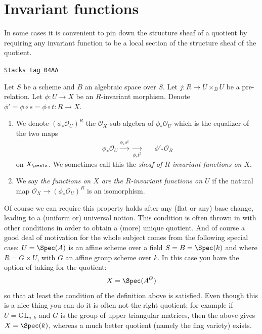 \section{Invariant functions}
\label{groupoids-quotients-section-functions}
In some cases it is convenient to pin down the structure sheaf
of a quotient by requiring any invariant function to be a local
section of the structure sheaf of the quotient.

\begin{definition}[Functions]
\label{groupoids-quotients-definition-functions}
\href{https://stacks.math.columbia.edu/tag/04AA}{\texttt{Stacks tag 04AA}}

Let $S$ be a scheme and $B$ an algebraic space over $S$.
Let $j : R \to U \times_B U$ be a pre-relation.
Let $\phi : U \to X$ be an $R$-invariant morphism.
Denote $\phi' = \phi \circ s = \phi \circ t : R \to X$.
\begin{enumerate}
\item We denote $(\phi_*\mathcal{O}_U)^R$ the $\mathcal{O}_X$-sub-algebra
of $\phi_*\mathcal{O}_U$ which is the equalizer of the two maps
$$
\begin{array}{ccc}\phi_*\mathcal{O}_U
\overset{\phi_*s^\sharp}{\longrightarrow}\underset{\phi_*t^\sharp}{\longrightarrow} &  & \phi'_*\mathcal{O}_R\end{array}
$$
on $X_\etale$. We sometimes call this the
{\it sheaf of $R$-invariant functions on $X$}.
\item We say {\it the functions on $X$ are the $R$-invariant functions on
$U$} if the natural map $\mathcal{O}_X \to (\phi_*\mathcal{O}_U)^R$
is an isomorphism.
\end{enumerate}
\end{definition}

Of course we can require this property holds after any
(flat or any) base change, leading to a (uniform or) universal notion.
This condition is often thrown in
with other conditions in order to obtain a (more) unique quotient. And of
course a good deal of motivation for the whole subject comes from the following
special case: $U = \Spec(A)$ is an affine scheme over a field
$S = B = \Spec(k)$ and where $R = G \times U$, with
$G$ an affine group scheme over $k$. In this case
you have the option of taking for the quotient:
$$
X = \Spec(A^G)
$$
so that at least the condition of the definition above is satisfied.
Even though this is a nice thing you can do it is often not the right
quotient; for example if $U = \text{GL}_{n, k}$ and $G$ is the group of
upper triangular matrices, then the above gives $X = \Spec(k)$, whereas
a much better quotient (namely the flag variety) exists.

